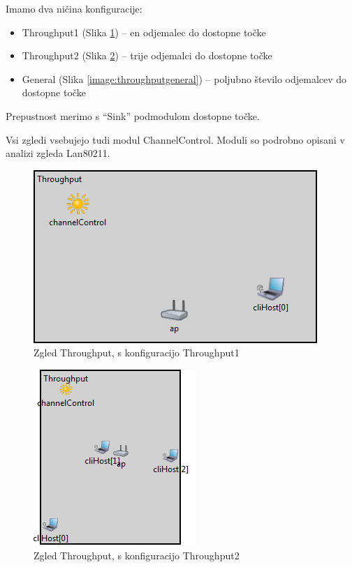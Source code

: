 \documentclass[a4paper,11pt]{article}
\begin{document}
Imamo dva ničina konfiguracije:

\begin{itemize}
    \item Throughput1 (Slika \ref{image:throughputthr1}) – en odjemalec do dostopne točke
    \item Throughput2 (Slika \ref{image:throughputthr2}) – trije odjemalci do dostopne točke
    \item General (Slika \ref{image:throughputgeneral}) – poljubno število odjemalcev do dostopne točke
\end{itemize}

Prepustnost merimo s ``Sink'' podmodulom dostopne točke.

Vsi zgledi vsebujejo tudi modul ChannelControl. Moduli so podrobno opisani v analizi zgleda Lan80211.


\begin{figure}[htbp]
    \begin{center}
        \includegraphics[scale=0.8]{img/zgledi/throughput_thr1.png}
        \caption{Zgled Throughput, s konfiguracijo Throughput1}
	\label{image:throughputthr1}
    \end{center}
\end{figure}


\begin{figure}[htbp]
    \begin{center}
        \includegraphics[scale=0.8]{img/zgledi/throughput_thr2.png}
        \caption{Zgled Throughput, s konfiguracijo Throughput2}
	\label{image:throughputthr2}
    \end{center}
\end{figure}
\end{document}
